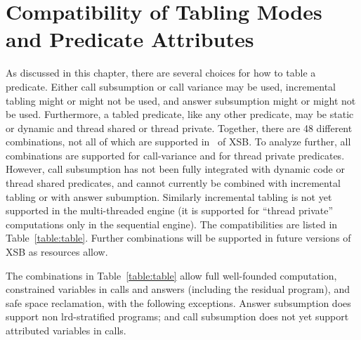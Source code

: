 
\section{Compatibility of Tabling Modes and Predicate Attributes} \label{sec:tabling-compatibility}
%
As discussed in this chapter, there are several choices for how to
table a predicate. Either call subsumption or call variance may be
used, incremental tabling might or might not be used, and answer
subsumption might or might not be used.  Furthermore, a tabled
predicate, like any other predicate, may be static or dynamic and
thread shared or thread private.  Together, there are 48 different
combinations, not all of which are supported in \version\ of XSB.  To
analyze further, all combinations are supported for call-variance and
for thread private predicates.  However, call subsumption has not been
fully integrated with dynamic code or thread shared predicates, and
cannot currently be combined with incremental tabling or with answer
subumption.  Similarly incremental tabling is not yet supported in the
multi-threaded engine (it is supported for ``thread private''
computations only in the sequential engine).  The compatibilities are
listed in Table~\ref{table:table}.  Further combinations will be
supported in future versions of XSB as resources allow.

The combinations in Table~\ref{table:table} allow full well-founded
computation, constrained variables in calls and answers (including the
residual program), and safe space reclamation, with the following
exceptions.  Answer subsumption does support non lrd-stratified
programs; and call subsumption does not yet support attributed
variables in calls.  


